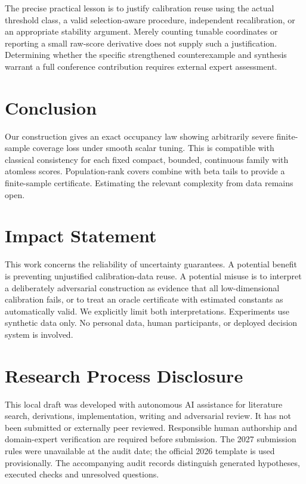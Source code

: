 \documentclass{article}
\begin{document}
The precise practical lesson is to justify calibration reuse using the actual threshold class, a valid selection-aware procedure, independent recalibration, or an appropriate stability argument. Merely counting tunable coordinates or reporting a small raw-score derivative does not supply such a justification. Determining whether the specific strengthened counterexample and synthesis warrant a full conference contribution requires external expert assessment.

\section{Conclusion}

Our construction gives an exact occupancy law showing arbitrarily severe finite-sample coverage loss under smooth scalar tuning. This is compatible with classical consistency for each fixed compact, bounded, continuous family with atomless scores. Population-rank covers combine with beta tails to provide a finite-sample certificate. Estimating the relevant complexity from data remains open.

\section*{Impact Statement}
This work concerns the reliability of uncertainty guarantees. A potential benefit is preventing unjustified calibration-data reuse. A potential misuse is to interpret a deliberately adversarial construction as evidence that all low-dimensional calibration fails, or to treat an oracle certificate with estimated constants as automatically valid. We explicitly limit both interpretations. Experiments use synthetic data only. No personal data, human participants, or deployed decision system is involved.

\section*{Research Process Disclosure}
This local draft was developed with autonomous AI assistance for literature search, derivations, implementation, writing and adversarial review. It has not been submitted or externally peer reviewed. Responsible human authorship and domain-expert verification are required before submission. The 2027 submission rules were unavailable at the audit date; the official 2026 template is used provisionally. The accompanying audit records distinguish generated hypotheses, executed checks and unresolved questions.
\end{document}
